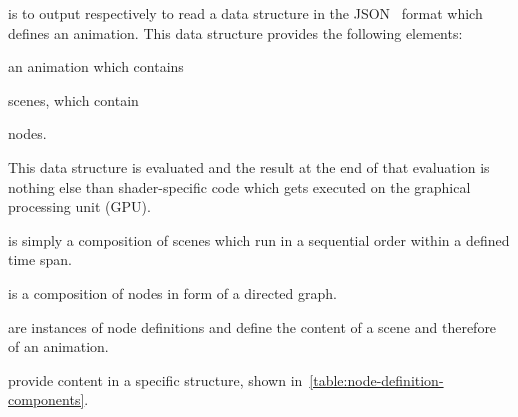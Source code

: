 \documentclass[%
    a4paper,    %
    justified,  %
    nobib,      %
    openany     %
]{tufte-book}
\begin{document}
 is to output respectively to
read a data structure in the JSON~\cite{ecma-json-2013} format which defines an
animation. This data structure provides the following elements:
\begin{enumerate*}
  \item an animation which contains
  \item scenes, which contain
  \item nodes.
\end{enumerate*}
This data structure is evaluated and the result at the end of that evaluation
is nothing else than shader-specific code which gets executed on the graphical
processing unit (GPU).

 is simply a composition of scenes which run in a
sequential order within a defined time span.

 is a composition of nodes in form of a directed graph.

 are instances of node definitions and define the content of a
scene and therefore of an animation.

 provide content in a specific structure, shown
in~\autoref{table:node-definition-components}.
\end{document}
